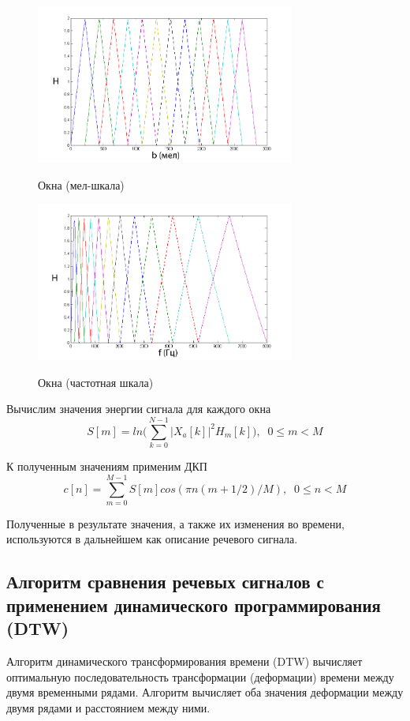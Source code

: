 \documentclass[14pt,russian,utf8,nocolumnsxix]{extarticle}
\begin{document}
\begin{figure}[H]
	\begin{multicols}{2}
		\hfill
		\includegraphics[width=85mm]{graph-3.png}
			\caption{Окна (мел-шкала)}
			\label{wind-mel}
		\includegraphics[width=85mm]{graph-4.png}
			\caption{Окна (частотная шкала)}
			\label{wind-hz}
	\end{multicols}
\end{figure}

Вычислим значения энергии сигнала для каждого окна
\[
	S[m]=ln(\sum_{k=0}^{N-1}{|X_{a}[k]|^{2}H_{m}[k])}, \; \; 0\leq m<M
\]

К полученным значениям применим ДКП
\[
	c[n]=\sum_{m=0}^{M-1}{S[m]cos(\pi n(m+1/2)/M)}, \; \; 0\leq n < M
\]

Полученные в результате значения, а также их изменения во времени, используются в дальнейшем как описание речевого сигнала.
\pagebreak

\subsection{Алгоритм сравнения речевых сигналов с применением динамического программирования (DTW)}

Алгоритм динамического трансформирования времени (DTW) вычисляет оптимальную последовательность трансформации (деформации) времени между двумя временными рядами. Алгоритм вычисляет оба значения деформации между двумя рядами и расстоянием между ними. 
\end{document}
